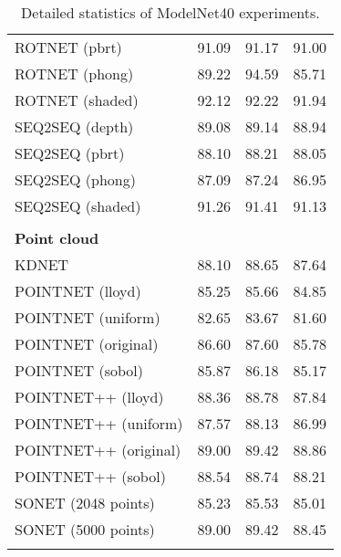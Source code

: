 \begin{table}[!h]
\begin{tabular}{lccc}
	    	ROTNET (pbrt)          &     91.09     &    91.17     &    91.00     \\
	    	ROTNET (phong)         &     89.22     &    94.59     &    85.71     \\
	    	ROTNET (shaded)        &     92.12     &    92.22     &    91.94     \\
	    	SEQ2SEQ (depth)        &     89.08     &    89.14     &    88.94     \\
	    	SEQ2SEQ (pbrt)         &     88.10     &    88.21     &    88.05     \\
	    	SEQ2SEQ (phong)        &     87.09     &    87.24     &    86.95     \\
	    	SEQ2SEQ (shaded)       &     91.26     &    91.41     &    91.13     \\ \hline
	    	                       &               &              &              \\
	    	\textbf{Point cloud  } &               &              &              \\
	    	KDNET                  &     88.10     &    88.65     &    87.64     \\
	    	POINTNET (lloyd)       &     85.25     &    85.66     &    84.85     \\
	    	POINTNET (uniform)     &     82.65     &    83.67     &    81.60     \\
	    	POINTNET (original)    &     86.60     &    87.60     &    85.78     \\
	    	POINTNET (sobol)       &     85.87     &    86.18     &    85.17     \\
	    	POINTNET++ (lloyd)     &     88.36     &    88.78     &    87.84     \\
	    	POINTNET++ (uniform)   &     87.57     &    88.13     &    86.99     \\
	    	POINTNET++ (original)  &     89.00     &    89.42     &    88.86     \\
	    	POINTNET++ (sobol)     &     88.54     &    88.74     &    88.21     \\
	    	SONET (2048 points)    &     85.23     &    85.53     &    85.01     \\
	    	SONET (5000 points)    &     89.00     &    89.42     &    88.45     \\ \hline
	    	                       &               &              &
	    \end{tabular}
\caption{Detailed statistics of ModelNet40 experiments.}
\label{Table:details}
\end{table}
